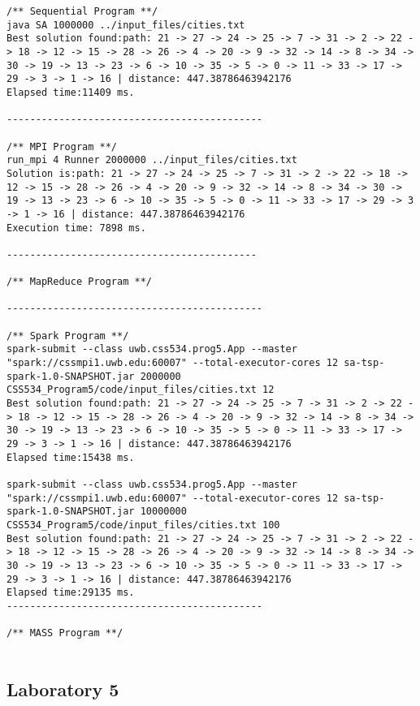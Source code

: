 \documentclass{article}
\begin{document}
			\begin{lstlisting}
/** Sequential Program **/
java SA 1000000 ../input_files/cities.txt
Best solution found:path: 21 -> 27 -> 24 -> 25 -> 7 -> 31 -> 2 -> 22 -> 18 -> 12 -> 15 -> 28 -> 26 -> 4 -> 20 -> 9 -> 32 -> 14 -> 8 -> 34 -> 30 -> 19 -> 13 -> 23 -> 6 -> 10 -> 35 -> 5 -> 0 -> 11 -> 33 -> 17 -> 29 -> 3 -> 1 -> 16 | distance: 447.38786463942176
Elapsed time:11409 ms.

--------------------------------------------

/** MPI Program **/
run_mpi 4 Runner 2000000 ../input_files/cities.txt
Solution is:path: 21 -> 27 -> 24 -> 25 -> 7 -> 31 -> 2 -> 22 -> 18 -> 12 -> 15 -> 28 -> 26 -> 4 -> 20 -> 9 -> 32 -> 14 -> 8 -> 34 -> 30 -> 19 -> 13 -> 23 -> 6 -> 10 -> 35 -> 5 -> 0 -> 11 -> 33 -> 17 -> 29 -> 3 -> 1 -> 16 | distance: 447.38786463942176
Execution time: 7898 ms.

-------------------------------------------

/** MapReduce Program **/

--------------------------------------------

/** Spark Program **/
spark-submit --class uwb.css534.prog5.App --master "spark://cssmpi1.uwb.edu:60007" --total-executor-cores 12 sa-tsp-spark-1.0-SNAPSHOT.jar 2000000 CSS534_Program5/code/input_files/cities.txt 12
Best solution found:path: 21 -> 27 -> 24 -> 25 -> 7 -> 31 -> 2 -> 22 -> 18 -> 12 -> 15 -> 28 -> 26 -> 4 -> 20 -> 9 -> 32 -> 14 -> 8 -> 34 -> 30 -> 19 -> 13 -> 23 -> 6 -> 10 -> 35 -> 5 -> 0 -> 11 -> 33 -> 17 -> 29 -> 3 -> 1 -> 16 | distance: 447.38786463942176
Elapsed time:15438 ms.

spark-submit --class uwb.css534.prog5.App --master "spark://cssmpi1.uwb.edu:60007" --total-executor-cores 12 sa-tsp-spark-1.0-SNAPSHOT.jar 10000000 CSS534_Program5/code/input_files/cities.txt 100
Best solution found:path: 21 -> 27 -> 24 -> 25 -> 7 -> 31 -> 2 -> 22 -> 18 -> 12 -> 15 -> 28 -> 26 -> 4 -> 20 -> 9 -> 32 -> 14 -> 8 -> 34 -> 30 -> 19 -> 13 -> 23 -> 6 -> 10 -> 35 -> 5 -> 0 -> 11 -> 33 -> 17 -> 29 -> 3 -> 1 -> 16 | distance: 447.38786463942176
Elapsed time:29135 ms.
--------------------------------------------

/** MASS Program **/


			\end{lstlisting}


		\subsection{Laboratory 5}\label{L5_OUT}	
\begin{lstlisting}

\end{lstlisting}


	
	
\end{document}
